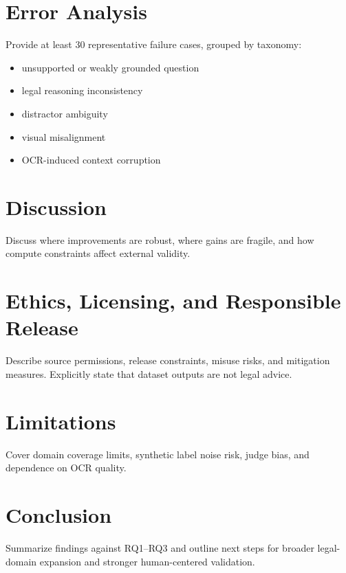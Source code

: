 \section{Error Analysis}
\label{sec:error}
Provide at least 30 representative failure cases, grouped by taxonomy:
\begin{itemize}
\item unsupported or weakly grounded question
\item legal reasoning inconsistency
\item distractor ambiguity
\item visual misalignment
\item OCR-induced context corruption
\end{itemize}

\section{Discussion}
\label{sec:discussion}
Discuss where improvements are robust, where gains are fragile, and how compute constraints affect external validity.

\section{Ethics, Licensing, and Responsible Release}
\label{sec:ethics}
Describe source permissions, release constraints, misuse risks, and mitigation measures. Explicitly state that dataset outputs are not legal advice.

\section{Limitations}
\label{sec:limitations}
Cover domain coverage limits, synthetic label noise risk, judge bias, and dependence on OCR quality.

\section{Conclusion}
\label{sec:conclusion}
Summarize findings against RQ1--RQ3 and outline next steps for broader legal-domain expansion and stronger human-centered validation.


